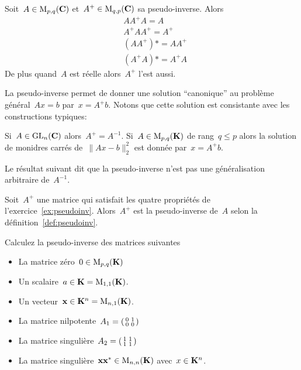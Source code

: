\begin{exercice}
	\label{ex:pseudoinv}
	Soit~$A\in\mathrm{M}_{p,q}(\mathbf{C})$ et~$A^+\in\mathrm{M}_{q,p}(\mathbf{C})$ sa pseudo-inverse.  Alors
	\begin{align*}
		& AA^+A=A \\
		& A^+AA^+=A^+ \\
		& (AA^+)*=AA^+ \\
		& (A^+A)*=A^+A
	\end{align*}
	De plus quand~$A$ est réelle alors~$A^+$ l'est aussi.
\end{exercice}

La pseudo-inverse permet de donner une solution ``canonique'' au problème
général~$Ax=b$ par~$x=A^+b$.  Notons que cette solution est consistante avec
les constructions typiques:

\begin{exercice}
	Si~$A\in\mathrm{GL}_n(\mathbf{C})$ alors~$A^+=A^{-1}$.
	Si~$A\in\mathrm{M}_{p,q}(\mathbf{K})$ de rang~$q\le p$ alors la solution de monidres carrés
	de~$\|Ax-b\|^2_2$ est donnée par~$x=A^+b$.
\end{exercice}

Le résultat suivant dit que la pseudo-inverse n'est pas une généralisation
arbitraire de~$A^{-1}$.

\begin{theorem}[Penrose 1955]
	Soit~$A^+$ une matrice qui satisfait les quatre propriétés de
	l'exercice~\ref{ex:pseudoinv}.  Alors~$A^+$ est la pseudo-inverse de~$A$
	selon la définition~\ref{def:pseudoinv}.
\end{theorem}

\begin{exercice}
	Calculez la pseudo-inverse des matrices suivantes
	\begin{itemize}
		\item La matrice zéro~$0\in\mathrm{M}_{p,q}(\mathbf{K})$
		\item Un scalaire~$a\in\mathbf{K}=\mathrm{M}_{1,1}(\mathbf{K})$.
		\item Un vecteur~$\mathbf{x}\in\mathbf{K}^n=\mathrm{M}_{n,1}(\mathbf{K})$.
		\item La matrice
			nilpotente~$A_1=\left(\begin{smallmatrix}0&1\\0&0\end{smallmatrix}\right)$
		\item La matrice
			singulière~$A_2=\left(\begin{smallmatrix}1&1\\1&1\end{smallmatrix}\right)$
		\item La matrice singulière~$\mathbf{x}\mathbf{x}^*\in\mathrm{M}_{n,n}(\mathbf{K})$ avec~$x\in\mathbf{K}^n$.
	\end{itemize}
\end{exercice}


